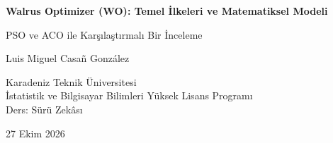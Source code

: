 \begin{titlepage}
  \centering

  \vspace*{1.5cm}

  {\LARGE\bfseries
    Walrus Optimizer (WO): Temel İlkeleri ve Matematiksel Modeli\par}

  \vspace{0.5cm}

  {\large
    PSO ve ACO ile Karşılaştırmalı Bir İnceleme\par}

  \vspace{1.5cm}

  {\large Luis Miguel Casañ González\par}

  \vfill

  {\small
    Karadeniz Teknik Üniversitesi\\
    İstatistik ve Bilgisayar Bilimleri Yüksek Lisans Programı\\
    Ders: Sürü Zekâsı\par}

  \vspace{0.5cm}

  {\normalsize 27 Ekim 2026\par}

  \vspace*{1.5cm}
\end{titlepage}